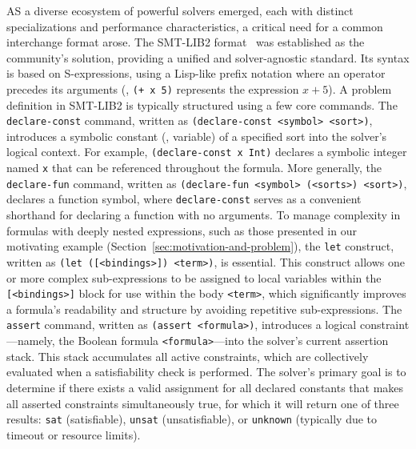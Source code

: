 AS a diverse ecosystem of powerful \SMT{} solvers emerged, each with distinct specializations and performance characteristics, a critical need for a common interchange format arose. The SMT-LIB2 format~\cite{barrett2010smtlib} was established as the community's solution, providing a unified and solver-agnostic standard. Its syntax is based on S-expressions, using a Lisp-like prefix notation where an operator precedes its arguments (\eg{}, \texttt{(+ x 5)} represents the expression $x+5$). A problem definition in SMT-LIB2 is typically structured using a few core commands.
The \texttt{declare-const} command, written as \texttt{(declare-const <symbol> <sort>)}, introduces a symbolic constant (\ie{}, variable) of a specified sort into the solver's logical context. For example, \texttt{(declare-const x Int)} declares a symbolic integer named \texttt{x} that can be referenced throughout the formula. More generally, the \texttt{declare-fun} command, written as \texttt{(declare-fun <symbol> (<sorts>) <sort>)}, declares a function symbol, where \texttt{declare-const} serves as a convenient shorthand for declaring a function with no arguments.
To manage complexity in formulas with deeply nested expressions, such as those presented in our motivating example (Section~\ref{sec:motivation-and-problem}), the \texttt{let} construct, written as \texttt{(let ([<bindings>]) <term>)}, is essential. This construct allows one or more complex sub-expressions to be assigned to local variables within the \texttt{[<bindings>]} block for use within the body \texttt{<term>}, which significantly improves a formula's readability and structure by avoiding repetitive sub-expressions.
The \texttt{assert} command, written as \texttt{(assert <formula>)}, introduces a logical constraint---namely, the Boolean formula \texttt{<formula>}---into the solver's current assertion stack. This stack accumulates all active constraints, which are collectively evaluated when a satisfiability check is performed. The solver's primary goal is to determine if there exists a valid assignment for all declared constants that makes all asserted constraints simultaneously true, for which it will return one of three results: \texttt{sat} (satisfiable), \texttt{unsat} (unsatisfiable), or \texttt{unknown} (typically due to timeout or resource limits).

